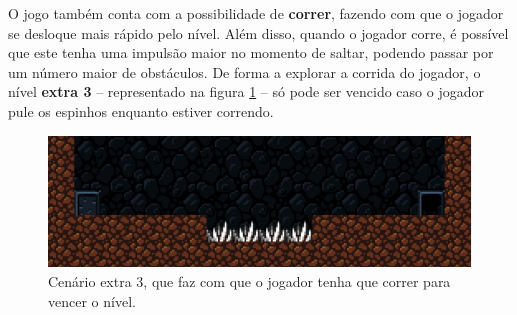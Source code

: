 O jogo também conta com a possibilidade de \textbf{correr}, fazendo com que o
jogador se desloque mais rápido pelo nível. Além disso, quando o jogador corre,
é possível que este tenha uma impulsão maior no momento de saltar, podendo
passar por um número maior de obstáculos. De forma a explorar a corrida do
jogador, o nível \textbf{extra 3} -- representado na figura \ref{fig:extra3} --
só pode ser vencido caso o jogador pule os espinhos enquanto estiver correndo.

\begin{figure}[H]
\centering
\includegraphics[width=\textwidth / 2]{fig/levels/extra3.pdf}
\caption{Cenário extra 3, que faz com que o jogador tenha que correr para
    vencer o nível.}
\label{fig:extra3}
\end{figure}
